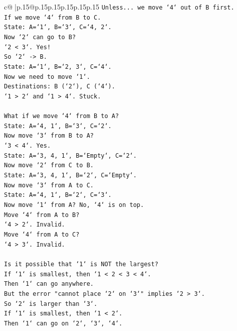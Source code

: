 \documentclass{article}
\begin{document}
{\begin{supertabular}{c@{$\;$}|p{.15\linewidth}@{}p{.15\linewidth}p{.15\linewidth}p{.15\linewidth}p{.15\linewidth}p{.15\linewidth}}
{{{\texttt{Unless... we move `4` out of B first.} \\
\texttt{If we move `4` from B to C.} \\
\texttt{State: A=`1`, B=`3`, C=`4, 2`.} \\
\texttt{Now `2` can go to B?} \\
\texttt{`2 < 3`. Yes!} \\
\texttt{So `2` {-}> B.} \\
\texttt{State: A=`1`, B=`2, 3`, C=`4`.} \\
\texttt{Now we need to move `1`.} \\
\texttt{Destinations: B (`2`), C (`4`).} \\
\texttt{`1 > 2` and `1 > 4`. Stuck.} \\
\\ 
\texttt{What if we move `4` from B to A?} \\
\texttt{State: A=`4, 1`, B=`3`, C=`2`.} \\
\texttt{Now move `3` from B to A?} \\
\texttt{`3 < 4`. Yes.} \\
\texttt{State: A=`3, 4, 1`, B=`Empty`, C=`2`.} \\
\texttt{Now move `2` from C to B.} \\
\texttt{State: A=`3, 4, 1`, B=`2`, C=`Empty`.} \\
\texttt{Now move `3` from A to C.} \\
\texttt{State: A=`4, 1`, B=`2`, C=`3`.} \\
\texttt{Now move `1` from A? No, `4` is on top.} \\
\texttt{Move `4` from A to B?} \\
\texttt{`4 > 2`. Invalid.} \\
\texttt{Move `4` from A to C?} \\
\texttt{`4 > 3`. Invalid.} \\
\\ 
\texttt{Is it possible that `1` is NOT the largest?} \\
\texttt{If `1` is smallest, then `1 < 2 < 3 < 4`.} \\
\texttt{Then `1` can go anywhere.} \\
\texttt{But the error "cannot place `2` on `3`" implies `2 > 3`.} \\
\texttt{So `2` is larger than `3`.} \\
\texttt{If `1` is smallest, then `1 < 2`.} \\
\texttt{Then `1` can go on `2`, `3`, `4`.} \\
}}}
\end{supertabular}}
\end{document}
